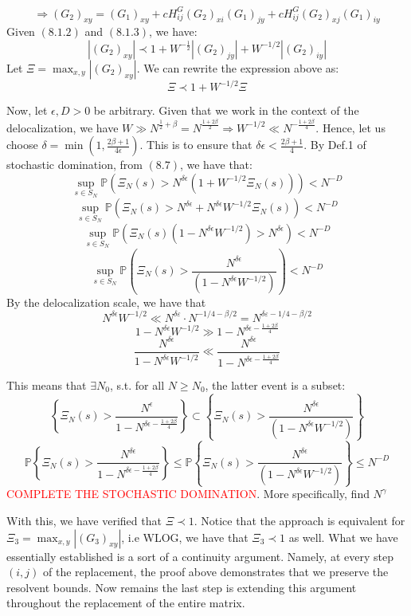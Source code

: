 \documentclass[11pt]{article}
\begin{document}
$$\Rightarrow (G_2)_{xy} = (G_1)_{xy} + cH_{ij}^G (G_2)_{xi}(G_1)_{jy}+{c}H_{ij}^G (G_2)_{xj}(G_1)_{iy}$$
Given $(8.1.2)$ and $(8.1.3)$, we have:
$$|(G_2)_{xy}|\prec 1 + W^{-\frac{1}{2}}|(G_2)_{jy}|+W^{-1/2}|(G_2)_{iy}|$$
Let $\Xi = \max_{x, y}|(G_2)_{xy}|$. We can rewrite the expression above as: 
\begin{equation*}\Xi \prec 1 + W^{-1/2}\Xi\tag{8.7}\end{equation*}

\noindent Now, let $\epsilon, D>0$ be arbitrary. Given that we work in the context of the delocalization, we have $W\gg N^{\frac{1}{2}+\beta} = N^{\frac{1+2\beta}{2}}\Rightarrow W^{-1/2}\ll N^{-\frac{1+2\beta}{4}}$. Hence, let us choose $\delta = \min \left(1, \frac{2\beta+1}{4\epsilon}\right)$. This is to ensure that $\delta\epsilon<\frac{2\beta+1}{4}$. By Def.1 of stochastic domination, from $(8.7)$, we have that: $$\sup_{s\in S_N}\mathbb{P}\left(\Xi_N(s)>N^{\delta\epsilon}(1+W^{-1/2}\Xi_N(s))\right)<N^{-D}$$
$$\sup_{s\in S_N}\mathbb{P}\left(\Xi_N(s)>N^{\delta\epsilon}+N^{\delta\epsilon} W^{-1/2}\Xi_N(s)\right)<N^{-D}$$
$$\sup_{s\in S_N}\mathbb{P}\left(\Xi_N(s)(1-N^{\delta\epsilon} W^{-1/2})>N^{\delta\epsilon}\right)<N^{-D}$$
$$\sup_{s\in S_N}\mathbb{P}\left(\Xi_N(s)>\frac{N^{\delta\epsilon}}{(1-N^{\delta\epsilon} W^{-1/2})}\right)<N^{-D}$$
By the delocalization scale, we have that $$N^{\delta\epsilon}W^{-1/2} \ll N^{\delta\varepsilon} \cdot N^{-1/4-\beta/2} = N^{\delta\varepsilon-1/4-\beta/2}$$
$$1-N^{\delta\epsilon} W^{-1/2}\gg 1-N^{\delta\epsilon -\frac{1+2\beta}{4}}$$
$$\frac{N^{\delta\epsilon}}{1-N^{\delta\epsilon} W^{-1/2}}\ll \frac{N^{\delta\epsilon}}{1-N^{{\delta\epsilon}-\frac{1+2\beta}{4}}}$$

\noindent This means that $\exists N_0$, s.t. for all $N\geq N_0$, the latter event is a subset: $$ \left\{\Xi_N(s)>\frac{N^\epsilon}{1-N^{{\delta\epsilon}-\frac{1+2\beta}{4}}}\right\}\subset \left\{\Xi_N(s)>\frac{N^{\delta\epsilon}}{(1-N^{\delta\epsilon} W^{-1/2})}\right\}$$
$$\mathbb{P} \left\{\Xi_N(s)>\frac{N^{\delta\epsilon}}{1-N^{\delta\epsilon-\frac{1+2\beta}{4}}}\right\}\leq\mathbb{P} \left\{\Xi_N(s)>\frac{N^{\delta\epsilon}}{(1-N^{\delta\epsilon} W^{-1/2})}\right\}\leq N^{-D}$$
 \textcolor{red}{COMPLETE THE STOCHASTIC DOMINATION}. More specifically, find $N^\gamma$

\noindent With this, we have verified that $\Xi\prec 1$.
Notice that the approach is equivalent for $\Xi_3 = \max_{x, y}|(G_3)_{xy}|$, i.e WLOG, we have that $\Xi_3\prec 1$ as well. What we have essentially established is a sort of a continuity argument. Namely, at every step $(i,j)$ of the replacement, the proof above demonstrates that we preserve the resolvent bounds. Now remains the last step is extending this argument throughout the replacement of the entire matrix. 
\end{document}
